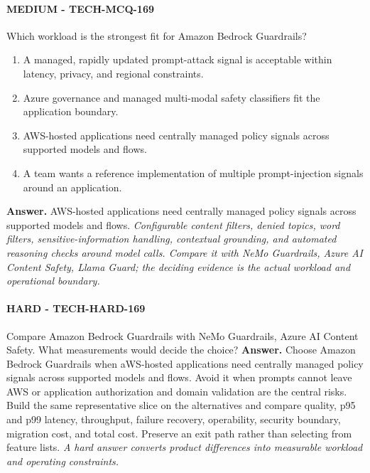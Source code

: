 \paragraph{MEDIUM - TECH-MCQ-169} Which workload is the strongest fit for Amazon Bedrock Guardrails?
\begin{enumerate}[label=\Alph*.]
\item A managed, rapidly updated prompt-attack signal is acceptable within latency, privacy, and regional constraints.
\item Azure governance and managed multi-modal safety classifiers fit the application boundary.
\item AWS-hosted applications need centrally managed policy signals across supported models and flows.
\item A team wants a reference implementation of multiple prompt-injection signals around an application.
\end{enumerate}
\textbf{Answer.} AWS-hosted applications need centrally managed policy signals across supported models and flows.
\textit{Configurable content filters, denied topics, word filters, sensitive-information handling, contextual grounding, and automated reasoning checks around model calls. Compare it with NeMo Guardrails, Azure AI Content Safety, Llama Guard; the deciding evidence is the actual workload and operational boundary.}
\paragraph{HARD - TECH-HARD-169} Compare Amazon Bedrock Guardrails with NeMo Guardrails, Azure AI Content Safety. What measurements would decide the choice?
\textbf{Answer.} Choose Amazon Bedrock Guardrails when aWS-hosted applications need centrally managed policy signals across supported models and flows. Avoid it when prompts cannot leave AWS or application authorization and domain validation are the central risks. Build the same representative slice on the alternatives and compare quality, p95 and p99 latency, throughput, failure recovery, operability, security boundary, migration cost, and total cost. Preserve an exit path rather than selecting from feature lists.
\textit{A hard answer converts product differences into measurable workload and operating constraints.}
